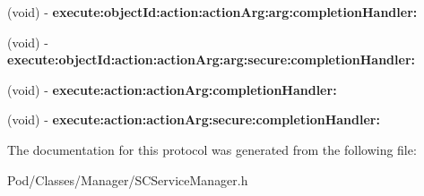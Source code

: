 \begin{DoxyCompactItemize}
\item 
(void) -\/ {\bfseries execute\+:object\+Id\+:action\+:action\+Arg\+:arg\+:completion\+Handler\+:}\hypertarget{protocol_s_c_service_manager_protocol-p_a771ffc781ee9496d48486405e89fb27f}{}\label{protocol_s_c_service_manager_protocol-p_a771ffc781ee9496d48486405e89fb27f}

\item 
(void) -\/ {\bfseries execute\+:object\+Id\+:action\+:action\+Arg\+:arg\+:secure\+:completion\+Handler\+:}\hypertarget{protocol_s_c_service_manager_protocol-p_afb112a590b3e8bb609da76e4657c621c}{}\label{protocol_s_c_service_manager_protocol-p_afb112a590b3e8bb609da76e4657c621c}

\item 
(void) -\/ {\bfseries execute\+:action\+:action\+Arg\+:completion\+Handler\+:}\hypertarget{protocol_s_c_service_manager_protocol-p_a1693f33c414a6025ad7b1a79dd88740e}{}\label{protocol_s_c_service_manager_protocol-p_a1693f33c414a6025ad7b1a79dd88740e}

\item 
(void) -\/ {\bfseries execute\+:action\+:action\+Arg\+:secure\+:completion\+Handler\+:}\hypertarget{protocol_s_c_service_manager_protocol-p_abb4b32075d301ef5acf1ff3b33b576e0}{}\label{protocol_s_c_service_manager_protocol-p_abb4b32075d301ef5acf1ff3b33b576e0}

\end{DoxyCompactItemize}


The documentation for this protocol was generated from the following file\+:\begin{DoxyCompactItemize}
\item 
Pod/\+Classes/\+Manager/S\+C\+Service\+Manager.\+h\end{DoxyCompactItemize}
